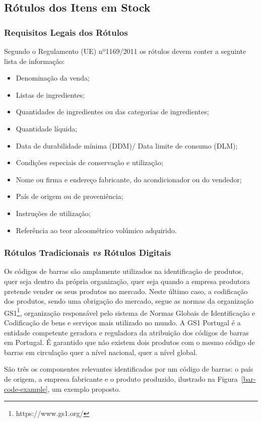 %
%
\subsection{Rótulos dos Itens em Stock}
\subsubsection{Requisitos Legais dos Rótulos}
Segundo o Regulamento (UE) nº1169/2011 \cite{asae:labeling} os rótulos devem conter a seguinte lista de informação:
\begin{itemize}
    \item Denominação da venda;
    \item Listas de ingredientes;
    \item Quantidades de ingredientes ou das categorias de ingredientes;
    \item Quantidade líquida;
    \item Data de durabilidade mínima (DDM)/ Data limite de consumo (DLM);
    \item Condições especiais de conservação e utilização;
    \item Nome ou firma e endereço fabricante, do acondicionador ou do vendedor;
    \item País de origem ou de proveniência;
    \item Instruções de utilização;
    \item Referência ao teor alcoométrico volúmico adquirido.
\end{itemize}

\subsubsection{Rótulos Tradicionais \textit{vs} Rótulos Digitais}
Os códigos de barras são amplamente utilizados na identificação de produtos, quer seja dentro da própria organização, quer seja quando a empresa produtora pretende vender os seus produtos no mercado. Neste último caso, a codificação dos produtos, sendo uma obrigação do mercado, segue as normas da organização GS1\footnote[1]{https://www.gs1.org/}, organização responsável pelo sistema de Normas Globais de Identificação e Codificação de bens e serviços mais utilizado no mundo. A GS1 Portugal é a entidade competente geradora e reguladora da atribuição dos códigos de barras em Portugal. É garantido que não existem dois produtos com o mesmo código de barras em circulação quer a nível nacional, quer a nível global. 

São três os componentes relevantes identificados por um código de barras: o país de origem, a empresa fabricante e o produto produzido, ilustrado na Figura~\ref{bar-code-example}, um exemplo proposto.

